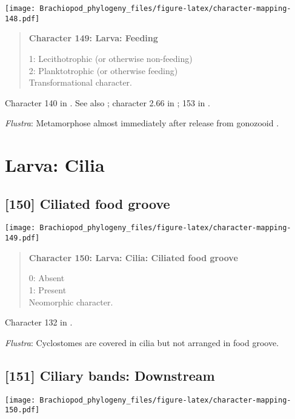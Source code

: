 \documentclass[openany]{book}
\theoremstyle{definition}
\theoremstyle{definition}
\theoremstyle{definition}
\theoremstyle{remark}
\begin{document}
\texttt{[image: Brachiopod\_phylogeny\_files/figure-latex/character-mapping-148.pdf]}

\begin{quote}
\textbf{Character 149: Larva: Feeding}

1: Lecithotrophic (or otherwise non-feeding)\\
2: Planktotrophic (or otherwise feeding)\\
Transformational character.
\end{quote}

Character 140 in \citet{Rouse1999}. See also \citet{Collin1997};
character 2.66 in \citet{SPS1996}; 153 in \citet{Giribet2002}.

\hypertarget{Flustra-coding-149}{}
\emph{Flustra}: Metamorphose almost immediately after release from
gonozooid \citep{Zimmer2013}.

\section{Larva: Cilia}\label{larva-cilia}

\subsection*{{[}150{]} Ciliated food groove}\label{ciliated-food-groove}

\texttt{[image: Brachiopod\_phylogeny\_files/figure-latex/character-mapping-149.pdf]}

\begin{quote}
\textbf{Character 150: Larva: Cilia: Ciliated food groove}

0: Absent\\
1: Present\\
Neomorphic character.
\end{quote}

Character 132 in \citet{Rouse1999}.

\hypertarget{Flustra-coding-150}{}
\emph{Flustra}: Cyclostomes are covered in cilia but not arranged in
food groove.

\subsection*{{[}151{]} Ciliary bands:
Downstream}\label{ciliary-bands-downstream}

\texttt{[image: Brachiopod\_phylogeny\_files/figure-latex/character-mapping-150.pdf]}
\end{document}
